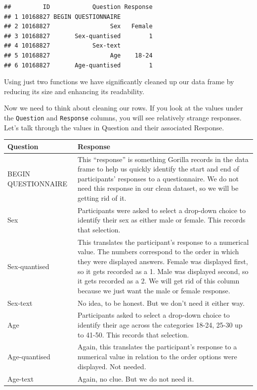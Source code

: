 \documentclass[
]{book}
\begin{document}
\begin{verbatim}
##         ID            Question Response
## 1 10168827 BEGIN QUESTIONNAIRE         
## 2 10168827                 Sex   Female
## 3 10168827       Sex-quantised        1
## 4 10168827            Sex-text         
## 5 10168827                 Age    18-24
## 6 10168827       Age-quantised        1
\end{verbatim}

Using just two functions we have significantly cleaned up our data frame by reducing its size and enhancing its readability.

Now we need to think about cleaning our rows. If you look at the values under the \texttt{Question} and \texttt{Response} columns, you will see relatively strange responses. Let's talk through the values in Question and their associated Response.

\begin{longtable}[]{@{}
  >{\raggedright\arraybackslash}p{}
  >{\raggedright\arraybackslash}p{}@{}}
\toprule\noalign{}
\begin{minipage}[b]{\linewidth}\raggedright
Question
\end{minipage} & \begin{minipage}[b]{\linewidth}\raggedright
Response
\end{minipage} \\
\midrule\noalign{}
\endhead
\bottomrule\noalign{}
\endlastfoot
BEGIN QUESTIONNAIRE & This ``response'' is something Gorilla records in the data frame to help us quickly identify the start and end of participants' responses to a questionnaire. We do not need this response in our clean dataset, so we will be getting rid of it. \\
Sex & Participants were asked to select a drop-down choice to identify their sex as either male or female. This records that selection. \\
Sex-quantised & This translates the participant's response to a numerical value. The numbers correspond to the order in which they were displayed answers. Female was displayed first, so it gets recorded as a 1. Male was displayed second, so it gets recorded as a 2. We will get rid of this column because we just want the male or female response. \\
Sex-text & No idea, to be honest. But we don't need it either way. \\
Age & Participants asked to select a drop-down choice to identify their age across the categories 18-24, 25-30 up to 41-50. This records that selection. \\
Age-quantised & Again, this translates the participant's response to a numerical value in relation to the order options were displayed. Not needed. \\
Age-text & Again, no clue. But we do not need it. \\
\end{longtable}
\end{document}
